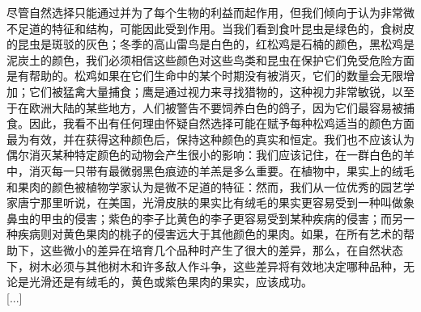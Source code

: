 \documentclass{article}
\begin{document}
尽管自然选择只能通过并为了每个生物的利益而起作用，但我们倾向于认为非常微不足道的特征和结构，可能因此受到作用。当我们看到食叶昆虫是绿色的，食树皮的昆虫是斑驳的灰色；冬季的高山雷鸟是白色的，红松鸡是石楠的颜色，黑松鸡是泥炭土的颜色，我们必须相信这些颜色对这些鸟类和昆虫在保护它们免受危险方面是有帮助的。松鸡如果在它们生命中的某个时期没有被消灭，它们的数量会无限增加；它们被猛禽大量捕食；鹰是通过视力来寻找猎物的，这种视力非常敏锐，以至于在欧洲大陆的某些地方，人们被警告不要饲养白色的鸽子，因为它们最容易被捕食。因此，我看不出有任何理由怀疑自然选择可能在赋予每种松鸡适当的颜色方面最为有效，并在获得这种颜色后，保持这种颜色的真实和恒定。我们也不应该认为偶尔消灭某种特定颜色的动物会产生很小的影响：我们应该记住，在一群白色的羊中，消灭每一只带有最微弱黑色痕迹的羊羔是多么重要。在植物中，果实上的绒毛和果肉的颜色被植物学家认为是微不足道的特征：然而，我们从一位优秀的园艺学家唐宁那里听说，在美国，光滑皮肤的果实比有绒毛的果实更容易受到一种叫做象鼻虫的甲虫的侵害；紫色的李子比黄色的李子更容易受到某种疾病的侵害；而另一种疾病则对黄色果肉的桃子的侵害远大于其他颜色的果肉。如果，在所有艺术的帮助下，这些微小的差异在培育几个品种时产生了很大的差异，那么，在自然状态下，树木必须与其他树木和许多敌人作斗争，这些差异将有效地决定哪种品种，无论是光滑还是有绒毛的，黄色或紫色果肉的果实，应该成功。\\

[...]\\
\end{document}
